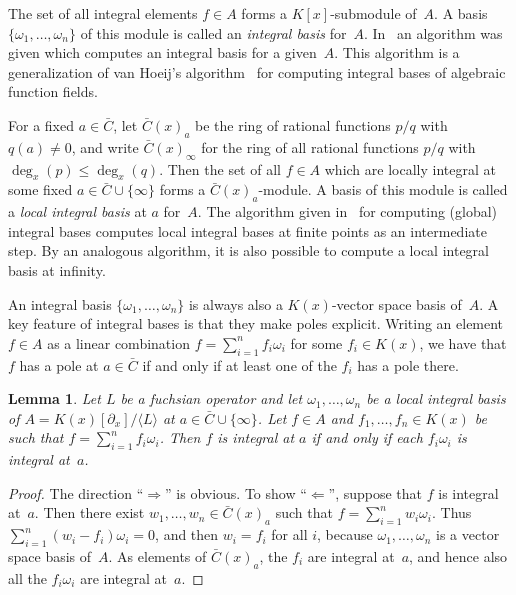 \documentclass{sig-alternate}
\newtheorem{lemma}[theorem]{Lemma}
\def\<#1>{\langle#1\rangle}
\begin{document}
The set of all integral elements $f\in A$ forms a $K[x]$-submodule of~$A$.
A basis $\{\omega_1,\dots,\omega_n\}$ of this module is called an \emph{integral basis}
for~$A$. In~\cite{kauers15b} an algorithm was given which computes an integral basis
for a given~$A$. This algorithm is a generalization of van Hoeij's
algorithm~\cite{vanHoeij94} for computing integral bases of algebraic function
fields.

For a fixed $a\in\bar C$, let $\bar C(x)_a$ be the ring of rational functions $p/q$
with $q(a)\neq0$, and write $\bar C(x)_\infty$ for the ring of all
rational functions $p/q$ with $\deg_x(p)\leq\deg_x(q)$.
Then the set of all $f\in A$ which are locally integral at some
fixed $a\in\bar C\cup\{\infty\}$ forms a $\bar C(x)_a$-module. A basis of this module is
called a \emph{local integral basis} at $a$ for~$A$. The algorithm given in~\cite{kauers15b}
for computing (global) integral bases computes local integral bases at finite
points as an intermediate step. By an analogous algorithm, it is also possible
to compute a local integral basis at infinity.

An integral basis $\{\omega_1,\dots,\omega_n\}$ is always also a $K(x)$-vector space
basis of~$A$. A key feature of integral bases is that they make poles explicit. Writing
an element $f\in A$ as a linear combination $f=\sum_{i=1}^n f_i\omega_i$ for some
$f_i\in K(x)$, we have that $f$ has a pole at $a\in\bar C$ if and only if at least one
of the $f_i$ has a pole there.

\begin{lemma}\label{lemma:1}
  Let $L$ be a fuchsian operator and let
  $\omega_1,\dots,\omega_n$ be a local integral basis of $A=K(x)[\partial_x]/\<L>$ at $a\in\bar C\cup\{\infty\}$.
  Let $f\in A$ and $f_1,\dots,f_n\in K(x)$ be such that $f=\sum_{i=1}^nf_i\omega_i$.
  Then $f$ is integral at $a$ if and only if each $f_i\omega_i$ is integral at~$a$.
\end{lemma}
\begin{proof}
  The direction ``$\Rightarrow$'' is obvious. To show ``$\Leftarrow$'', suppose
  that $f$ is integral at~$a$. Then there exist $w_1,\dots,w_n\in\bar C(x)_a$ such that
  $f=\sum_{i=1}^nw_i\omega_i$. Thus $\sum_{i=1}^n(w_i-f_i)\omega_i=0$, and then
  $w_i=f_i$ for all $i$, because $\omega_1,\dots,\omega_n$ is a vector space basis of~$A$.
  As elements of $\bar C(x)_a$, the $f_i$ are integral at~$a$, and hence also all the $f_i\omega_i$
  are integral at~$a$.
\end{proof}
\end{document}
